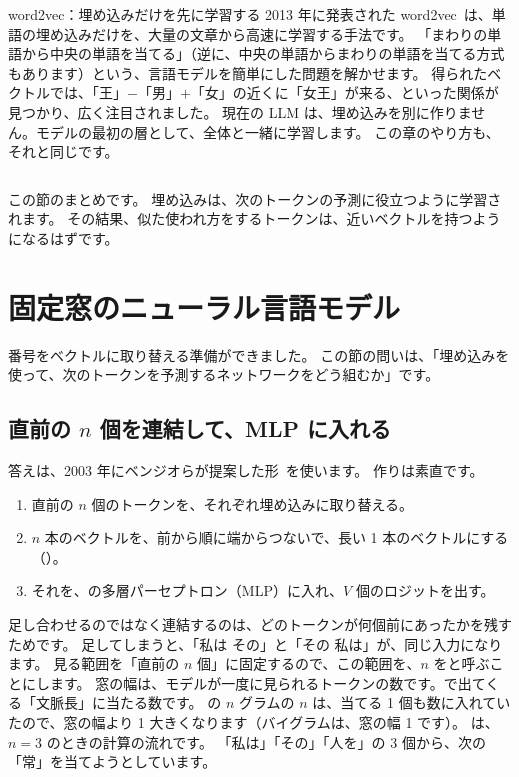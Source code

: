\begin{column}{word2vec：埋め込みだけを先に学習する}
2013 年に発表された word2vec~\cite{mikolov2013efficient}は、単語の埋め込みだけを、大量の文章から高速に学習する手法です。
「まわりの単語から中央の単語を当てる」（逆に、中央の単語からまわりの単語を当てる方式もあります）という、言語モデルを簡単にした問題を解かせます。
得られたベクトルでは、「王」$-$「男」$+$「女」の近くに「女王」が来る、といった関係が見つかり、広く注目されました。
現在の LLM は、埋め込みを別に作りません。モデルの最初の層として、全体と一緒に学習します。
この章のやり方も、それと同じです。
\end{column}

この節のまとめです。
埋め込みは、次のトークンの予測に役立つように学習されます。
その結果、似た使われ方をするトークンは、近いベクトルを持つようになるはずです。

\section{固定窓のニューラル言語モデル}\label{sec:emb-mlp}

番号をベクトルに取り替える準備ができました。
この節の問いは、「埋め込みを使って、次のトークンを予測するネットワークをどう組むか」です。

\subsection*{直前の $n$ 個を連結して、MLP に入れる}

答えは、2003 年にベンジオらが提案した形~\cite{bengio2003neural}を使います。
作りは素直です。
\begin{enumerate}
\item 直前の $n$ 個のトークンを、それぞれ埋め込みに取り替える。
\item $n$ 本のベクトルを、前から順に端からつないで、長い 1 本のベクトルにする（）。
\item それを、の多層パーセプトロン（MLP）に入れ、$V$ 個のロジットを出す。
\end{enumerate}
足し合わせるのではなく連結するのは、どのトークンが何個前にあったかを残すためです。
足してしまうと、「私は その」と「その 私は」が、同じ入力になります。
見る範囲を「直前の $n$ 個」に固定するので、この範囲を、$n$ をと呼ぶことにします。
窓の幅は、モデルが一度に見られるトークンの数です。で出てくる「文脈長」に当たる数です。
の $n$ グラムの $n$ は、当てる 1 個も数に入れていたので、窓の幅より 1 大きくなります（バイグラムは、窓の幅 1 です）。
は、$n=3$ のときの計算の流れです。
「私は」「その」「人を」の 3 個から、次の「常」を当てようとしています。

